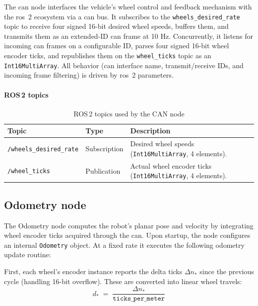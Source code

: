 The \gls{can} node interfaces the vehicle's wheel control and feedback mechanism with the \gls{ros}~2 ecosystem via a \gls{can} bus. It subscribes to the \texttt{wheels\_desired\_rate} topic to receive four signed 16-bit desired wheel speeds, buffers them, and transmits them as an extended-ID \gls{can} frame at 10 Hz. Concurrently, it listens for incoming \gls{can} frames on a configurable ID, parses four signed 16-bit wheel encoder ticks, and republishes them on the \texttt{wheel\_ticks} topic as an \texttt{Int16MultiArray}. All behavior (\gls{can} interface name, transmit/receive IDs, and incoming frame filtering) is driven by \gls{ros}~2 parameters.

\paragraph*{ROS\,2 topics}
\begin{table}[H]
  \centering
  \begin{tabular}{lll}
    \toprule
    \textbf{Topic}                  & \textbf{Type}                                                      & \textbf{Description} \\
    \midrule
    \texttt{/wheels\_desired\_rate} & Subscription
                                    & Desired wheel speeds (\texttt{Int16MultiArray}, 4 elements).                              \\
    \texttt{/wheel\_ticks}          & Publication
                                    & Actual wheel encoder ticks (\texttt{Int16MultiArray}, 4 elements).                        \\
    \bottomrule
  \end{tabular}
  \caption{ROS\,2 topics used by the CAN node}
  \label{tab:can-topics}
\end{table}

\subsection{Odometry node}

The Odometry node computes the robot's planar pose and velocity by integrating wheel encoder ticks acquired through the \gls{can}. Upon startup, the node configures an internal \texttt{Odometry} object. At a fixed rate it executes the following odometry update routine:

First, each wheel's encoder instance reports the delta ticks $\Delta n_*$ since the previous cycle (handling 16-bit overflow). These are converted into linear wheel travels:
\begin{equation}
  d_* \;=\; \frac{\Delta n_*}{\mathtt{ticks\_per\_meter}}
\end{equation}

